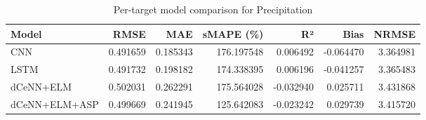 \begin{table}
\caption{Per-target model comparison for Precipitation}
\begin{tabular}{lrrrrrr}
\toprule
Model & RMSE & MAE & sMAPE (\%) & R² & Bias & NRMSE \\
\midrule
CNN & 0.491659 & 0.185343 & 176.197548 & 0.006492 & -0.064470 & 3.364981 \\
LSTM & 0.491732 & 0.198182 & 174.338395 & 0.006196 & -0.041257 & 3.365483 \\
dCeNN+ELM & 0.502031 & 0.262291 & 175.564028 & -0.032940 & 0.025711 & 3.431868 \\
dCeNN+ELM+ASP & 0.499669 & 0.241945 & 125.642083 & -0.023242 & 0.029739 & 3.415720 \\
\bottomrule
\end{tabular}
\end{table}
